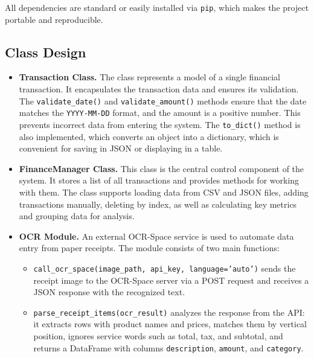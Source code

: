 \documentclass[conference]{IEEEtran}
\begin{document}
All dependencies are standard or easily installed via \texttt{pip}, which makes the project portable and reproducible.

\subsection{Class Design}
\begin{itemize}
\item \textbf{Transaction Class.} The class represents a model of a single financial transaction. It encapsulates the transaction data and ensures its validation. The \texttt{validate\_date()} and \texttt{validate\_amount()} methods ensure that the date matches the \texttt{YYYY-MM-DD} format, and the amount is a positive number. This prevents incorrect data from entering the system. The \texttt{to\_dict()} method is also implemented, which converts an object into a dictionary, which is convenient for saving in JSON or displaying in a table.
\item \textbf{FinanceManager Class.} This class is the central control component of the system. It stores a list of all transactions and provides methods for working with them. The class supports loading data from CSV and JSON files, adding transactions manually, deleting by index, as well as calculating key metrics and grouping data for analysis.
\item \textbf{OCR Module.} An external OCR-Space service is used to automate data entry from paper receipts. The module consists of two main functions:
\begin{itemize}
\item \texttt{call\_ocr\_space(image\_path, api\_key, language='auto')} sends the receipt image to the OCR-Space server via a POST request and receives a JSON response with the recognized text.
\item \texttt{parse\_receipt\_items(ocr\_result)} analyzes the response from the API: it extracts rows with product names and prices, matches them by vertical position, ignores service words such as total, tax, and subtotal, and returns a DataFrame with columns \texttt{description}, \texttt{amount}, and \texttt{category}.
\end{itemize}
\end{itemize}
\end{document}
